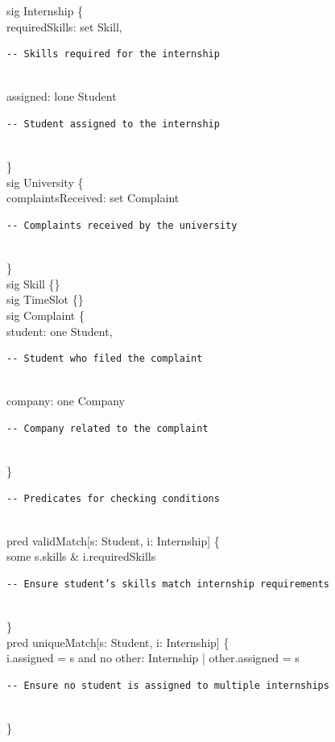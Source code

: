 sig Internship \{ \\
  requiredSkills: set Skill, \begin{verbatim}
-- Skills required for the internship
\end{verbatim}\\
  assigned: lone Student      \begin{verbatim}
-- Student assigned to the internship
\end{verbatim}\\
\} \\

sig University \{ \\
  complaintsReceived: set Complaint \begin{verbatim}
-- Complaints received by the university
\end{verbatim}\\
\} \\

sig Skill \{\} \\
sig TimeSlot \{\} \\
sig Complaint \{ \\
  student: one Student,       \begin{verbatim}
-- Student who filed the complaint
\end{verbatim}\\
  company: one Company        \begin{verbatim}
-- Company related to the complaint
\end{verbatim}\\
\} \\

\begin{verbatim}
-- Predicates for checking conditions
\end{verbatim}\\
pred validMatch[s: Student, i: Internship] \{ \\
  some s.skills \& i.requiredSkills \begin{verbatim}
-- Ensure student’s skills match internship requirements
\end{verbatim}\\
\} \\

pred uniqueMatch[s: Student, i: Internship] \{ \\
  i.assigned = s and no other: Internship | other.assigned = s \begin{verbatim}
-- Ensure no student is assigned to multiple internships
\end{verbatim}\\
\} \\

